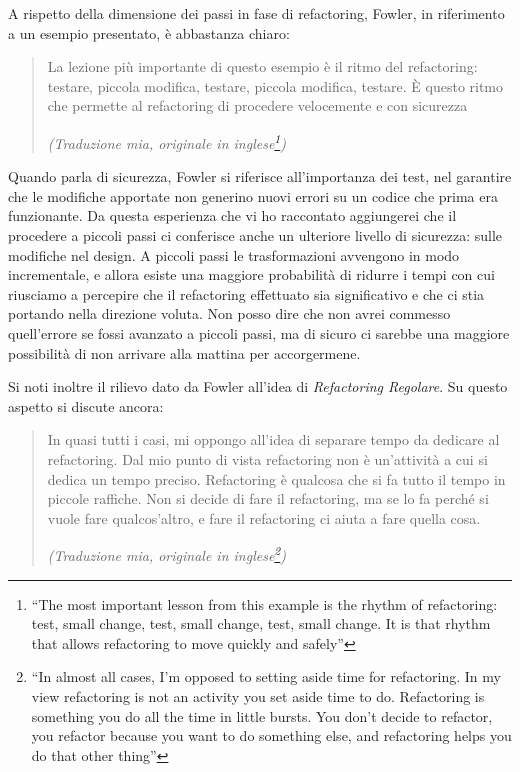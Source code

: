 \documentclass[12pt]{report}
\begin{document}
A rispetto della dimensione dei passi in fase di refactoring, Fowler, in
riferimento a un esempio presentato, è abbastanza chiaro:

\begin{quote}
La lezione più importante di questo esempio è il ritmo del refactoring:
testare, piccola modifica, testare, piccola modifica, testare. È questo
ritmo che permette al refactoring di procedere velocemente
e con sicurezza\cite{fowler2002}

\flushright\textit{(Traduzione mia, originale in inglese\footnote{
``The most important lesson from this example is the rhythm of refactoring:
test, small change, test, small change, test, small change. It is that
rhythm that allows refactoring to move quickly and safely''
})
}
\end{quote}

Quando parla di sicurezza, Fowler si riferisce all'importanza dei test,
nel garantire che le modifiche apportate non generino nuovi errori
su un codice che prima era funzionante. Da questa esperienza che vi ho
raccontato aggiungerei che il procedere a piccoli passi ci conferisce
anche un ulteriore livello di sicurezza: sulle modifiche nel design. 
A piccoli passi le trasformazioni avvengono in modo incrementale,
e allora esiste una maggiore probabilità di ridurre i tempi con cui 
riusciamo a percepire che il refactoring effettuato sia significativo 
e che ci stia portando nella direzione voluta.
Non posso dire che non avrei commesso quell'errore se fossi avanzato
a piccoli passi, ma di sicuro ci sarebbe una maggiore possibilità di non arrivare alla mattina per accorgermene.

Si noti inoltre il rilievo dato da Fowler all'idea di 
\textit{Refactoring Regolare}. Su questo aspetto si discute
ancora:

\begin{quote}
In quasi tutti i casi, mi oppongo all'idea di separare tempo da dedicare
al refactoring. Dal mio punto di vista refactoring non è un'attività a cui
si dedica un tempo preciso. Refactoring è qualcosa che si fa tutto il tempo
in piccole raffiche. Non si decide di fare il refactoring, ma se lo fa
perché si vuole fare qualcos'altro, e fare il refactoring ci aiuta a 
fare quella cosa\cite{fowler2002}.

\flushright
\textit{(Traduzione mia, originale in inglese\footnote{
``In almost all cases, I'm opposed to setting aside time for refactoring.
In my view refactoring is not an activity you set aside time to do.
Refactoring is something you do all the time in little bursts. You don't
decide to refactor, you refactor because you want to do something else,
and refactoring helps you do that other thing''
})
}
\end{quote}
\end{document}
